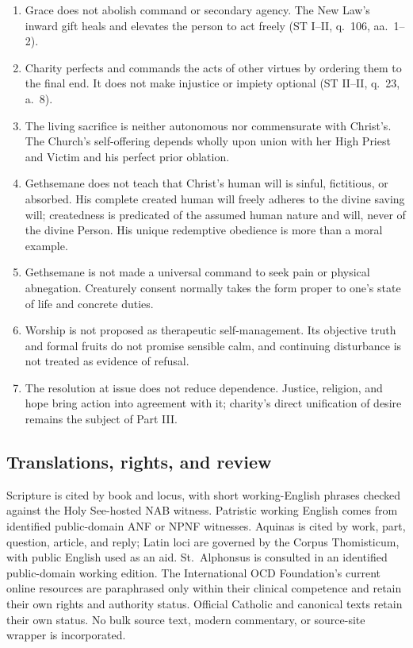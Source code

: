 \begin{enumerate}[leftmargin=1.45em,itemsep=0.25em]
\item Grace does not abolish command or secondary agency. The New Law's inward gift heals and elevates the person to act freely (ST I--II, q.~106, aa.~1--2).
\item Charity perfects and commands the acts of other virtues by ordering them to the final end. It does not make injustice or impiety optional (ST II--II, q.~23, a.~8).
\item The living sacrifice is neither autonomous nor commensurate with Christ's. The Church's self-offering depends wholly upon union with her High Priest and Victim and his perfect prior oblation.
\item Gethsemane does not teach that Christ's human will is sinful, fictitious, or absorbed. His complete created human will freely adheres to the divine saving will; createdness is predicated of the assumed human nature and will, never of the divine Person. His unique redemptive obedience is more than a moral example.
\item Gethsemane is not made a universal command to seek pain or physical abnegation. Creaturely consent normally takes the form proper to one's state of life and concrete duties.
\item Worship is not proposed as therapeutic self-management. Its objective truth and formal fruits do not promise sensible calm, and continuing disturbance is not treated as evidence of refusal.
\item The resolution at issue does not reduce dependence. Justice, religion, and hope bring action into agreement with it; charity's direct unification of desire remains the subject of Part III.
\end{enumerate}

\subsection{Translations, rights, and review}

Scripture is cited by book and locus, with short working-English phrases checked against the Holy See-hosted NAB witness. Patristic working English comes from identified public-domain ANF or NPNF witnesses. Aquinas is cited by work, part, question, article, and reply; Latin loci are governed by the Corpus Thomisticum, with public English used as an aid. St.~Alphonsus is consulted in an identified public-domain working edition. The International OCD Foundation's current online resources are paraphrased only within their clinical competence and retain their own rights and authority status. Official Catholic and canonical texts retain their own status. No bulk source text, modern commentary, or source-site wrapper is incorporated.

